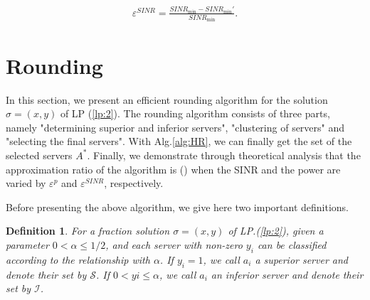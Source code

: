 \documentclass[11pt,a4paper]{article}
\newtheorem{definition}[theorem]{Definition}
\begin{document}
\begin{eqnarray}
	{\varepsilon ^{SINR}} = \frac{{SINR_{\min}} - SINR_{\min}'}{{SIN{R_{\min }}}}.
\end{eqnarray}



\section{Rounding}
In this section, we present an efficient rounding algorithm for the solution $\sigma=(x,y)$ of LP (\ref{lp:2}). The rounding algorithm consists of three parts, namely "determining superior and inferior servers", "clustering of servers" and "selecting the final servers". With Alg.\ref{alg:HR}, we can finally get the set of the selected servers $A^*$. Finally, we demonstrate through theoretical analysis that the approximation ratio of the algorithm is () when the SINR and the power are varied by $\varepsilon^p$ and $\varepsilon^{SINR}$, respectively.


Before presenting the above algorithm, we give here two important definitions. 

\begin{definition}
	For a fraction solution $\sigma=(x,y)$ of LP.(\ref{lp:2}),  given a parameter $0<\alpha\le1/2$, and each server with non-zero $y_i$ can be classified according to the relationship with $\alpha$. If $y_i=1$, we call $a_i$ a superior server and denote their set by $\mathcal{S}$. If $0< yi\le \alpha$, we call $a_i$ an inferior server and denote their set by $\mathcal{I}$.
\end{definition}
\end{document}

